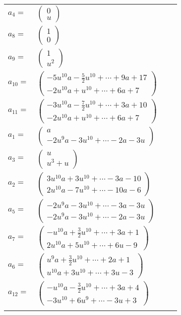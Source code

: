 \documentclass[1p]{elsarticle_modified}
\theoremstyle{definition}
\begin{document}
\begin{tabular}{m{7pt} m{180pt} m{7pt} m{180pt} }
\flushright $a_{4}=$&$\begin{pmatrix}0\\u\end{pmatrix}$ \\
\flushright $a_{8}=$&$\begin{pmatrix}1\\0\end{pmatrix}$ \\
\flushright $a_{9}=$&$\begin{pmatrix}1\\u^2\end{pmatrix}$ \\
\flushright $a_{10}=$&$\begin{pmatrix}-5 u^{10} a-\frac{5}{2} u^{10}+\cdots+9 a+17\\-2 u^{10} a+u^{10}+\cdots+6 a+7\end{pmatrix}$ \\
\flushright $a_{11}=$&$\begin{pmatrix}-3 u^{10} a-\frac{7}{2} u^{10}+\cdots+3 a+10\\-2 u^{10} a+u^{10}+\cdots+6 a+7\end{pmatrix}$ \\
\flushright $a_{1}=$&$\begin{pmatrix}a\\-2 u^9 a-3 u^{10}+\cdots-2 a-3 u\end{pmatrix}$ \\
\flushright $a_{3}=$&$\begin{pmatrix}u\\u^3+u\end{pmatrix}$ \\
\flushright $a_{2}=$&$\begin{pmatrix}3 u^{10} a+3 u^{10}+\cdots-3 a-10\\2 u^{10} a-7 u^{10}+\cdots-10 a-6\end{pmatrix}$ \\
\flushright $a_{5}=$&$\begin{pmatrix}-2 u^9 a-3 u^{10}+\cdots-3 a-3 u\\-2 u^9 a-3 u^{10}+\cdots-2 a-3 u\end{pmatrix}$ \\
\flushright $a_{7}=$&$\begin{pmatrix}- u^{10} a+\frac{3}{2} u^{10}+\cdots+3 a+1\\2 u^{10} a+5 u^{10}+\cdots+6 u-9\end{pmatrix}$ \\
\flushright $a_{6}=$&$\begin{pmatrix}u^9 a+\frac{3}{2} u^{10}+\cdots+2 a+1\\u^{10} a+3 u^{10}+\cdots+3 u-3\end{pmatrix}$ \\
\flushright $a_{12}=$&$\begin{pmatrix}- u^{10} a-\frac{3}{2} u^{10}+\cdots+3 a+4\\-3 u^{10}+6 u^9+\cdots-3 u+3\end{pmatrix}$\\&\end{tabular}
\end{document}
